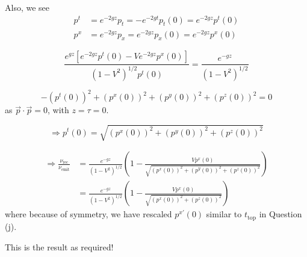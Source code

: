 \documentclass[a4paper]{article} %
\begin{document}
Also, we see
\begin{align}
p^t&=e^{-2gz}p_t=-e^{-2gt}p_t(0)=e^{-2gz}p^{t}(0)\\
p^x&=e^{-2gz}p_x=e^{-2gz}p_{x}(0)=e^{-2gz}p^x(0)
\end{align}

\begin{equation}
\frac{e^{gz}\left[e^{-2gz}p^t(0)-Ve^{-2gz}p^x(0)\right]}{(1-V^2)^{1/2}p^t(0)}
=\frac{e^{-gz}}{(1-V^2)^{1/2}}
\end{equation}

\begin{equation}
-(p^t(0))^2+(p^x(0))^2+(p^y(0))^2+(p^z(0))^2=0
\end{equation}
as $\vec{p}\cdot\vec{p}=0$, with $z=\tau=0$.

\begin{equation}
\Rightarrow p^t(0)=\sqrt{(p^x(0))^2+(p^y(0))^2+(p^z(0))^2}
\end{equation}

\begin{align}
\Rightarrow \frac{\nu_{\text{rec}}}{\nu_{\text{emit}}}&=
\frac{e^{-gz}}{(1-V^2)^{1/2}}\left(1-\frac{Vp^x(0)}
{\sqrt{(p^x(0))^2+(p^y(0))^2+(p^z(0))^2}}\right)\\
&=\frac{e^{-gz}}{(1-V^2)^{1/2}}\left(1-
\frac{Vp^{x}(0)}{\sqrt{(p^x(0))^2+(p^z(0))^2}}\right)
\end{align}
where because of symmetry, we have rescaled $p^{x'}(0)$ similar to $t_{\text{top}}$ in Question (j).

This is the result as required!
\end{document}

